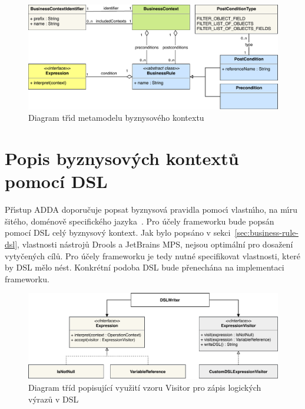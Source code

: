 \begin{figure}
    \centering
    \includegraphics[keepaspectratio=true, width=\linewidth]{figures/business-context-metamodel.pdf}
    \caption{Diagram tř\'{\i}d metamodelu byznysového kontextu}
    \label{fig:business-context-metamodel}
\end{figure}

\section{Popis byznysových kontextů pomocí \gls{DSL}}

Př\'{\i}stup \gls{ADDA} doporučuje popsat byznysová pravidla pomoc\'{\i}
vlastn\'{\i}ho, na m\'{\i}ru šitého, doménově specifického jazyka~\cite{cemus2015automated}.
Pro účely frameworku bude popsán pomocí \gls{DSL} celý byznysový kontext.
Jak bylo popsáno v sekci~\ref{sec:business-rule-dsl}, vlastnosti nástrojů Drools a JetBrains MPS,
nejsou optimální pro dosažení vytyčených cílů. Pro účely frameworku je tedy nutné specifikovat vlastnosti,
které by \gls{DSL} mělo nést. Konkrétní podoba DSL bude přenechána na implementaci frameworku.

\begin{figure}
    \centering
    \includegraphics[keepaspectratio=true, width=1\linewidth]{figures/expression-visitor.pdf}
    \caption{Diagram tříd popisující využití vzoru Visitor pro zápis logických výrazů v \gls{DSL}}
    \label{fig:expression-visitor}
\end{figure}

